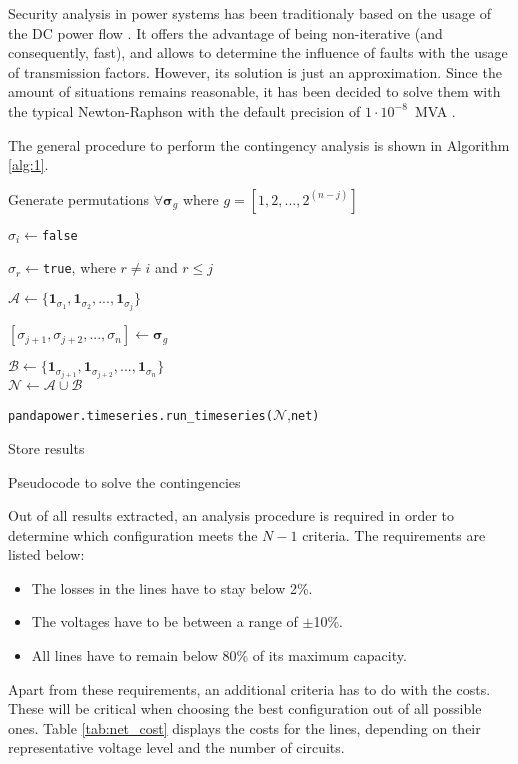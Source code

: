 Security analysis in power systems has been traditionaly based on the usage of the DC power flow \cite{stott2009dc, capitanescu2011state}. It offers the advantage of being non-iterative (and consequently, fast), and allows to determine the influence of faults with the usage of transmission factors. However, its solution is just an approximation. Since the amount of situations remains reasonable, it has been decided to solve them with the typical Newton-Raphson with the default precision of $1\cdot 10^{-8}$~MVA \cite{pandapower2018}. 

The general procedure to perform the contingency analysis is shown in Algorithm \ref{alg:1}.

\begin{algorithm}[!htb]
\DontPrintSemicolon
  
  Generate permutations $\forall \bm{\sigma}_{g}$ where $g=[1,2,...,2^{(n-j)}]$

  {
    $\sigma_i\gets$\texttt{false}

    $\sigma_r\gets$\texttt{true}, where $r\neq i$ and $r\leq j$

    $\mathcal{A}\gets \{\mathbf{1}_{\sigma_{1}}, \mathbf{1}_{\sigma_{2}},..., \mathbf{1}_{\sigma_{j}}\}$\\

    {
      $[\sigma_{j+1}, \sigma_{j+2},..., \sigma_n] \gets \bm{\sigma}_g$

    $\mathcal{B} \gets \{\mathbf{1}_{\sigma_{j+1}}, \mathbf{1}_{\sigma_{j+2}},..., \mathbf{1}_{\sigma_{n}}\}$\\

    $\mathcal{N} \gets \mathcal{A} \cup \mathcal{B}$

    \texttt{pandapower.timeseries.run\_timeseries(}$\mathcal{N}$,\texttt{net)}

    Store results
    }
  }
\caption{Pseudocode to solve the contingencies}
\label{alg:1}
\end{algorithm}
Out of all results extracted, an analysis procedure is required in order to determine which configuration meets the $N-1$ criteria. The requirements are listed below:
\begin{itemize}
  \item The losses in the lines have to stay below 2\%.
    \vspace{-0.5cm}
    \item The voltages have to be between a range of $\pm$10\%.
      \vspace{-0.5cm}
    \item All lines have to remain below 80\% of its maximum capacity.
\end{itemize}
Apart from these requirements, an additional criteria has to do with the costs. These will be critical when choosing the best configuration out of all possible ones. Table \ref{tab:net_cost} displays the costs for the lines, depending on their representative voltage level and the number of circuits.

